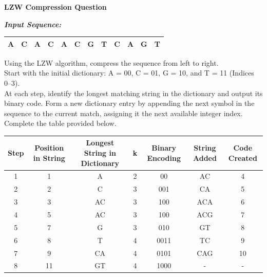 \documentclass[11pt]{article}
\begin{document}
\begin{center}
{\Large \textbf{LZW Compression Question}}
\end{center}
\vspace{1em}
\noindent \textit{\textbf{Input Sequence:}}
\begin{center}
\renewcommand{\arraystretch}{1.5}
\begin{tabular}{|c|c|c|c|c|c|c|c|c|c|c|c|}
\hline
\rowcolor{white!95!black} A & C & A & C & A & C & G & T & C & A & G & T \\
\hline
\end{tabular}
\end{center}
\vspace{1em}
\noindent Using the LZW algorithm, compress the sequence from left to right. \\[1.5em]
Start with the initial dictionary: A = 00, C = 01, G = 10, and T = 11 (Indices 0--3). \\[1.5em]
At each step, identify the longest matching string in the dictionary and output its binary code. Form a new dictionary entry by appending the next symbol in the sequence to the current match, assigning it the next available integer index. Complete the table provided below.
\vspace{3em}
\par
{}
\vspace{1em}
\begin{center}
\small
\renewcommand{\arraystretch}{1.4}
\begin{tabular}{|c|c|c|c|c|c|c|}
\hline
\rowcolor{lightgray} Step & Position in String & Longest String in Dictionary & k & Binary Encoding & String Added & Code Created \\
\hline
1 & 1 & A & 2 & 00 & AC & 4 \\ \hline
2 & 2 & C & 3 & 001 & CA & 5 \\ \hline
3 & 3 & AC & 3 & 100 & ACA & 6 \\ \hline
4 & 5 & AC & 3 & 100 & ACG & 7 \\ \hline
5 & 7 & G & 3 & 010 & GT & 8 \\ \hline
6 & 8 & T & 4 & 0011 & TC & 9 \\ \hline
7 & 9 & CA & 4 & 0101 & CAG & 10 \\ \hline
8 & 11 & GT & 4 & 1000 & - & - \\ \hline
\end{tabular}
\end{center}
\vspace{1em}
\end{document}
